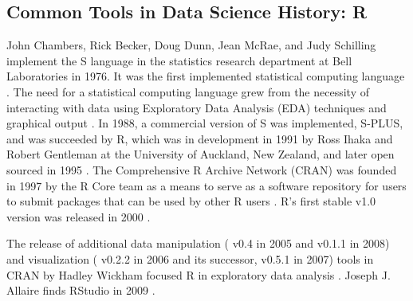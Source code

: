 \documentclass[010-intro.tex]{subfiles}
\begin{document}
    \subsection{Common Tools in Data Science History: R}
    \label{ss:intro-r-history}

        John Chambers, Rick Becker, Doug Dunn, Jean McRae, and Judy Schilling
        implement the S language in the statistics research department at Bell Laboratories in 1976.
        It was the first implemented statistical computing language
        \cite{beckerBriefHistory1994}.
        The need for a statistical computing language grew from the necessity of interacting with data using Exploratory Data Analysis (EDA)
        techniques and graphical output
        \cite{beckerBriefHistory1994}.
        In 1988, a commercial version of S was implemented, S-PLUS, and was
        succeeded by R, which was in development in 1991 by
        Ross Ihaka and Robert Gentleman at the University of Auckland, New Zealand,
        and later open sourced in 1995
        \cite{beckerBriefHistory1994}.
        The Comprehensive R Archive Network (CRAN) was founded in 1997 by the R Core team
        as a means to serve as a software repository for users to submit packages that can be
        used by other R users
        \cite{hornikAnnounceCRAN1997}.
        R's first stable v1.0 version was released in 2000
        \cite{smith16YearsProject2016, ihakaProjectBriefHistory}.

        The release of additional
        data manipulation
        ( v0.4 in 2005 and  v0.1.1 in 2008)
        and visualization
        ( v0.2.2 in 2006 and its successor,  v0.5.1 in 2007)
        tools in CRAN by Hadley Wickham
        focused R in exploratory data analysis
        \cite{wickhamPracticalToolsExploring2008, tukeyExploratoryDataAnalysis1977}.
        Joseph J. Allaire finds RStudio in 2009
        \cite{allaireRStudioPBC2020, rstudioRStudio}.
\end{document}
